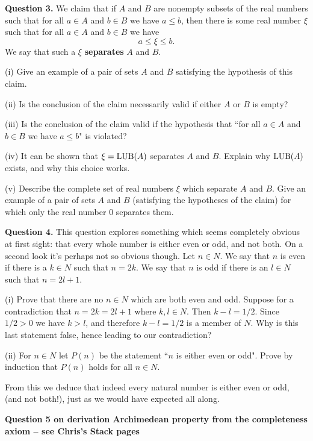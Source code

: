 \documentclass[12pt]{article}
\begin{document}
\medskip
\noindent
{\bf Question 3.} We claim that if $A$ and $B$ are nonempty subsets of the real numbers such that for all $a \in A$ and $b \in B$ we have $a \leq b$, then there is some real number $\xi$ such that
for all $a \in A$ and $b \in B$ we have
\[ a \leq \xi \leq b.\]
We say that such a $\xi$ {\bf separates}
$A$ and $B$.

\medskip
(i) Give an example of a pair of sets $A$ and $B$ satisfying the hypothesis of this claim. 

\medskip
(ii) Is the conclusion of the claim necessarily valid if either $A$ or $B$ is empty?

\medskip
(iii) Is the conclusion of the claim valid if the hypothesis that ``for all $a \in A$ and $b \in B$ we have $a \leq b$" is violated?

\medskip
(iv) It can be shown that $\xi = {\rm LUB}(A)$ separates $A$ and $B$. Explain why ${\rm LUB}(A)$ exists, and why this choice works. 

\medskip
(v) Describe the complete set of real numbers $\xi$ which separate $A$ and $B$. Give an example of a pair of sets $A$ and $B$ (satisfying the hypotheses of the claim) for which only the real number $0$ separates them.

\medskip
\noindent
{\bf Question 4.} This question explores something which seems completely obvious at first sight: that every whole number is either even or odd, and not both. On a second look it's perhaps not so obvious though. Let $n \in N$. We say that $n$ is even if there is a $k \in N$ such that $n = 2k$. We say that $n$ is odd if there is an $l \in N$ such that $n = 2l+1$.

\medskip
(i) Prove that there are no $n \in N$ which are both even and odd. Suppose for a contradiction that $n = 2k = 2l+1$ where $k, l \in N$. Then $k - l =1/2$. Since $1/2 > 0$ we have $k > l$, and therefore $k-l = 1/2$ is a member of $N$. Why is this last statement false, hence leading to our contradiction?

\medskip
(ii) For $n \in N$ let $P(n)$ be the statement ``$n$ is either even or odd". Prove by induction that $P(n)$ holds for all $n \in N$. 

\medskip
\noindent
From this we deduce that indeed every natural number is either even or odd, (and not both!), just as we would have expected all along.

\bigskip
{\bf Question 5 on derivation Archimedean property from the completeness axiom -- see Chris's Stack pages}
\end{document}
